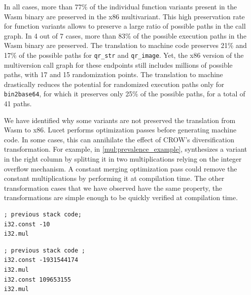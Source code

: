  
In all cases, more than 77\% of the individual function variants present in the Wasm binary are preserved in the x86 multivariant. This high preservation rate for function variants allows to preserve a large ratio of possible paths in the call graph.
In 4 out of 7 cases, more than 83\% of the possible execution paths in the Wasm  binary are preserved.
The translation to machine code preserves 21\% and 17\% of the possible paths for \texttt{qr\_str} and \texttt{qr\_image}. Yet, the x86 version of the multiversion call graph for these endpoints still includes millions of possible paths, with 17 and 15 randomization points. The translation to machine drastically reduces the potential for randomized execution paths only for \texttt{bin2base64}, for which it preserves only 25\% of the possible paths, for a total of 41 paths.

We have identified why some variants are not preserved the translation from Wasm to x86. Lucet performs optimization passes before generating machine code. 
In some cases, this can annihilate the effect of CROW's diversification transformation. 
For example, in \autoref{mul:prevalence_example}, synthesizes a variant in the right column by splitting it in two  multiplications relying on the integer overflow mechanism. 
A  constant merging optimization pass could remove the constant multiplications by performing it at compilation time. 
The other transformation cases that we have observed have the same property, the transformations are simple enough to be quickly verified at compilation time.

\lstset{
    language=WAT,
    style=WATStyle,
    stepnumber=0,
    label=EQExample}
\begin{code}
\noindent\begin{minipage}[b]{0.9\linewidth}
    
    \begin{minipage}[t]{0.45\linewidth}
        \begin{lstlisting}
; previous stack code;
i32.const -10
i32.mul
        \end{lstlisting}
    \end{minipage}%
    \hfill\noindent\begin{minipage}[t]{0.45\linewidth}
       
        \begin{lstlisting}
; previous stack code ;
i32.const -1931544174
i32.mul
i32.const 109653155
i32.mul
        \end{lstlisting}
    \end{minipage}
    
    \label{mul:prevalence_example}
\end{minipage}
\end{code}





